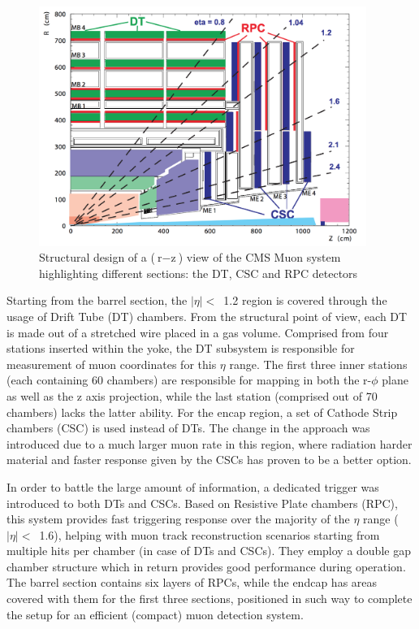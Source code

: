 \begin{figure}[htbp]
  \centering
    \includegraphics[width=0.95\textwidth]{CMS_experiment/Muon_chambers.png}
  \caption[Structural design of a ($\text{r}-\text{z}$) slice of the CMS Muon system highlighting different subsystems: the DT, CSC and RPC detectors.]{Structural design of a ($\text{r}-\text{z}$) view of the CMS Muon system highlighting different sections: the DT, CSC and RPC detectors~\cite{cms:tdr}}
  \label{fig:muon_chambers}
\end{figure}

\hspace{10pt} Starting from the barrel section, the $|\eta|<$~1.2 region is covered through the usage of Drift Tube (DT) chambers. From the structural point of view, each DT is made out of a stretched wire placed in a gas volume. Comprised from four stations inserted within the yoke, the DT subsystem is responsible for measurement of muon coordinates for this $\eta$ range. The first three inner stations (each containing 60 chambers) are responsible for mapping in both the r-$\phi$ plane as well as the z axis projection, while the last station (comprised out of 70 chambers) lacks the latter ability. For the encap region, a set of Cathode Strip chambers (CSC) is used instead of DTs. The change in the approach was introduced due to a much larger muon rate in this region, where radiation harder material and faster response given by the CSCs has proven to be a better option. 

\hspace{10pt} In order to battle the large amount of information, a dedicated trigger was introduced to both DTs and CSCs. Based on Resistive Plate chambers (RPC), this system provides fast triggering response over the majority of the $\eta$ range ($|\eta|<$~1.6), helping with muon track reconstruction scenarios starting from multiple hits per chamber (in case of DTs and CSCs). They employ a double gap chamber structure which in return provides good performance during operation. The barrel section contains six layers of RPCs, while the endcap has areas covered with them for the first three sections, positioned in such way to complete the setup for an efficient (compact) muon detection system. 








